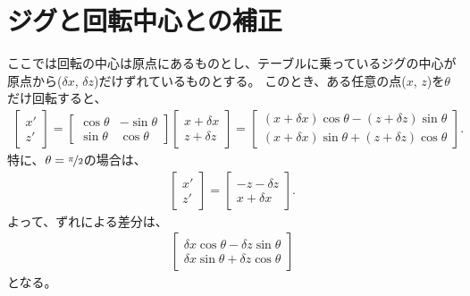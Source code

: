 \section{ジグと回転中心との補正}
ここでは回転の中心は原点にあるものとし、テーブルに乗っているジグの中心が原点から($\delta x$, $\delta z$)だけずれているものとする。
このとき、ある任意の点($x$, $z$)を$\theta$だけ回転すると、
\begin{align*}
  \left[
    \begin{array}{c}
      x'\\
      z'
    \end{array}
  \right]
  = \left[
    \begin{array}{cc}
      \cos\theta & -\sin\theta\\
      \sin\theta & \cos\theta
    \end{array}
  \right]\!\!
  \left[
    \begin{array}{c}
      x+\delta x\\
      z+\delta z
    \end{array}
  \right]
  = \left[
    \begin{array}{c}
      (x+\delta x)\cos\theta-(z+\delta z)\sin\theta\\
      (x+\delta x)\sin\theta+(z+\delta z)\cos\theta
    \end{array}
  \right].
\end{align*}
特に、$\theta = \nicefrac\pi2$の場合は、
\begin{align*}
  \left[
    \begin{array}{c}
      x'\\
      z'
    \end{array}
  \right]
  = \left[
    \begin{array}{c}
      -z-\delta z\\
      x+\delta x
    \end{array}
  \right].
\end{align*}
よって、ずれによる差分は、
\begin{align*}
  \left[
    \begin{array}{c}
      \delta x\cos\theta-\delta z\sin\theta\\
      \delta x\sin\theta+\delta z\cos\theta
    \end{array}
  \right]
\end{align*}
となる。




\clearpage
